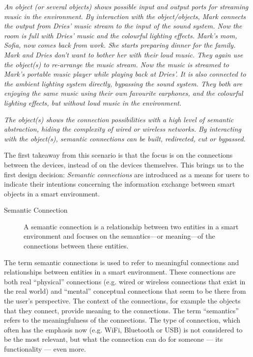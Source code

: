 \emph{An object (or several objects) shows possible input and output ports for streaming music in the environment. By interaction with the object/objects, Mark connects the output from Dries' music stream to the input of the sound system. Now the room is full with Dries' music and the colourful lighting effects. Mark's mom, Sofia, now comes back from work. She starts preparing dinner for the family. Mark and Dries don't want to bother her with their loud music. They again use the object(s) to re-arrange the music stream. Now the music is streamed to Mark's portable music player while playing back at Dries'. It is also connected to the ambient lighting system directly, bypassing the sound system. They both are enjoying the same music using their own favourite earphones, and the colourful lighting effects, but without loud music in the environment.}

\emph{The object(s) shows the connection possibilities with a high level of semantic abstraction, hiding the complexity of wired or wireless networks. By interacting with the object(s), semantic connections can be built, redirected, cut or bypassed.}

The first takeaway from this scenario is that the focus is on the connections between the devices, instead of on the devices themselves. This brings us to the first design decision: \emph{Semantic connections} are introduced as a means for users to indicate their intentions concerning the information exchange between smart objects in a smart environment. 


\begin{description}
	\item [Semantic Connection] A semantic connection is a relationship between two entities in a smart environment and focuses on the semantics---or meaning---of the connections between these entities. 
\end{description}

The term semantic connections is used to refer to meaningful connections and relationships between entities in a smart environment. These connections are both real ``physical'' connections (e.g. wired or wireless connections that exist in the real world) and ``mental'' conceptual connections that seem to be there from the user's perspective. The context of the connections, for example the objects that they connect, provide meaning to the connections. The term ``semantics'' refers to the meaningfulness of the connections. The type of connection, which often has the emphasis now (e.g. WiFi, Bluetooth or USB) is not considered to be the most relevant, but what the connection can do for someone --- its functionality --- even more.

